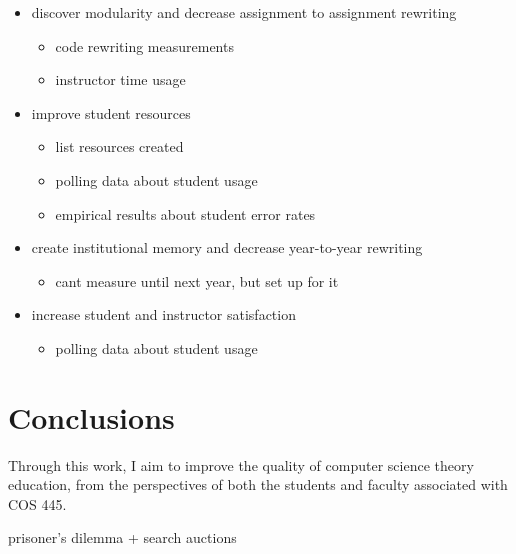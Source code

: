 \documentclass[pageno]{jpaper}
\begin{document}
\begin{itemize}
\item discover modularity and decrease assignment to assignment rewriting
  \begin{itemize}
  \item code rewriting measurements
  \item instructor time usage
  \end{itemize}
\item improve student resources
  \begin{itemize}
  \item list resources created
  \item polling data about student usage
  \item empirical results about student error rates
  \end{itemize}
\item create institutional memory and decrease year-to-year rewriting
  \begin{itemize}
  \item cant measure until next year, but set up for it
  \end{itemize}
\item increase student and instructor satisfaction
  \begin{itemize}
  \item polling data about student usage
  \end{itemize}
\end{itemize}


\section*{Conclusions}
Through this work, I aim to improve the quality of computer science theory education, from the perspectives of both the students and faculty associated with COS 445.

prisoner's dilemma + search auctions

\end{document}
